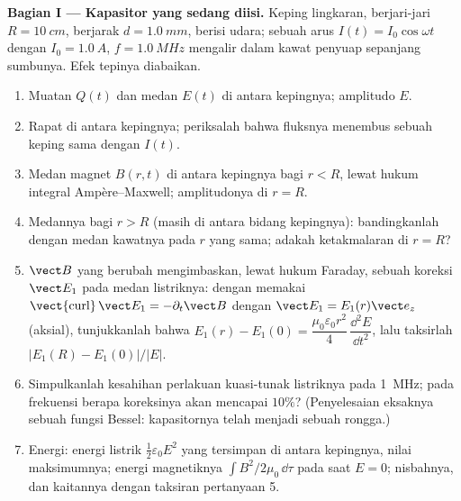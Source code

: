 \begin{problem}
\label{pb:b2:maxwell-equations:1}

\medskip
\noindent\textbf{Bagian I --- Kapasitor yang sedang diisi.}
Keping lingkaran, berjari-jari $R = \qty{10}{cm}$, berjarak $d = \qty{1.0}{mm}$,
berisi udara; sebuah arus $I(t) = I_0\cos\omega t$ dengan $I_0 = \qty{1.0}{A}$, $f = \qty{1.0}{MHz}$
mengalir dalam kawat penyuap sepanjang sumbunya. Efek tepinya diabaikan.
\begin{enumerate}
  \item Muatan $Q(t)$ dan medan $E(t)$ di antara kepingnya; amplitudo
        $E$.
  \item Rapat  di antara kepingnya; periksalah bahwa
        fluksnya menembus sebuah keping sama dengan $I(t)$.
  \item Medan magnet $B(r, t)$ di antara kepingnya bagi $r < R$, lewat
        hukum integral Ampère--Maxwell; amplitudonya di $r = R$.
  \item Medannya bagi $r > R$ (masih di antara bidang kepingnya):
        bandingkanlah dengan medan kawatnya pada $r$ yang sama; adakah
        ketakmalaran di $r = R$?
  \item $\vect B$ yang berubah mengimbaskan, lewat hukum Faraday, sebuah koreksi
        $\vect E_1$ pada medan listriknya: dengan memakai $\operatorname{\vect{curl}}\vect E_1
        = -\partial_t\vect B$ dengan $\vect E_1 = E_1(r)\vect e_z$ (aksial), tunjukkanlah bahwa
        $E_1(r) - E_1(0) = \dfrac{\mu_0\varepsilon_0r^2}4\,\dfrac{\dd^2E}{\dd t^2}$, lalu
        taksirlah $|E_1(R) - E_1(0)|/|E|$.
  \item Simpulkanlah kesahihan perlakuan kuasi-tunak listriknya
        pada \qty{1}{MHz}; pada frekuensi berapa koreksinya akan
        mencapai $10\%$? (Penyelesaian eksaknya sebuah fungsi Bessel:
        kapasitornya telah menjadi sebuah rongga.)
  \item Energi: energi listrik $\tfrac12\varepsilon_0E^2$ yang tersimpan di antara
        kepingnya, nilai maksimumnya; energi magnetiknya $\int B^2/2\mu_0\,\dd\tau$
        pada saat $E = 0$; nisbahnya, dan kaitannya dengan
        taksiran pertanyaan 5.
\end{enumerate}


\end{problem}
